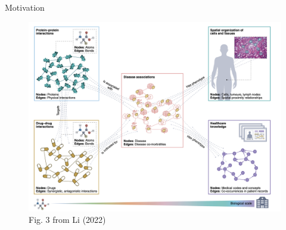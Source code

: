 \documentclass{beamer}
\begin{document}
\begin{frame}{Motivation}
    \begin{figure}
        \centering
        \includegraphics[scale=0.25]{Multimodal_Concep.png}
        \caption{Fig. 3 from Li (2022) \cite{li_graph_2022}}
    \end{figure}
\end{frame}
\end{document}
